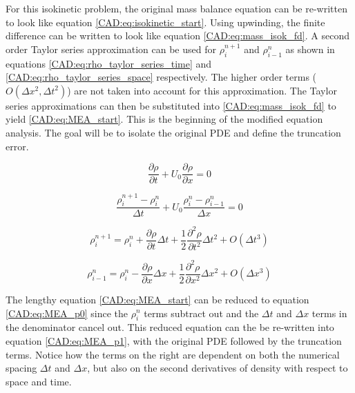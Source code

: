 \documentclass{mc2015}
\begin{document}
    For this isokinetic problem, the original mass balance equation can be re-written to 
    look like equation \ref{CAD:eq:isokinetic_start}. Using upwinding, the finite difference
    can be written to look like equation \ref{CAD:eq:mass_isok_fd}. A second order Taylor 
    series approximation can be used for $\rho_{i}^{n+1}$ and $\rho_{i-1}^{n}$ as shown 
    in equations \ref{CAD:eq:rho_taylor_series_time} and \ref{CAD:eq:rho_taylor_series_space} 
    respectively. The higher order terms ($O(\Delta x^{2},\Delta t^{2} )$) are
    not taken into account for this approximation. The Taylor series
    approximations can then be substituted into \ref{CAD:eq:mass_isok_fd} to yield
    \ref{CAD:eq:MEA_start}. This is the beginning of the modified equation analysis.
    The goal will be to isolate the original PDE and define the truncation error.
    
    \begin{equation}
    	\label{CAD:eq:isokinetic_start}
    	\frac{\partial \rho}{\partial t} + U_{0} \frac{\partial \rho}{\partial x} = 0
    \end{equation}
    
    \begin{equation}
    	\label{CAD:eq:mass_isok_fd}
    	\frac{ \rho_{i}^{n+1} - \rho_{i}^{n} }{\Delta t} 
    	+ U_{0} \frac{\rho_{i}^{n} - \rho_{i-1}^{n}}{\Delta x} = 0
    \end{equation}
    
    \begin{equation}
    	\label{CAD:eq:rho_taylor_series_time}
    	\rho_{i}^{n+1} =  \rho_{i}^{n} + 
    	\frac{\partial \rho}{\partial t} \Delta t +
    	\frac{1}{2} \frac{\partial^2 \rho}{\partial t^2} \Delta t^2 + O(\Delta t^{3})
    \end{equation}
    
    \begin{equation}
    	\label{CAD:eq:rho_taylor_series_space}
    	\rho_{i-1}^{n} =  \rho_{i}^{n} - 
    	\frac{\partial \rho}{\partial x} \Delta x +
    	\frac{1}{2} \frac{\partial^2 \rho}{\partial x^2} \Delta x^2 + O(\Delta x^{3})
    \end{equation}
    
    The lengthy equation \ref{CAD:eq:MEA_start} can be reduced to equation
    \ref{CAD:eq:MEA_p0} since the $\rho_{i}^{n}$ terms subtract out and the $\Delta
    t$ and $\Delta x$ terms in the denominator cancel out. This reduced equation
    can the be re-written into equation \ref{CAD:eq:MEA_p1}, with the original PDE
    followed by the truncation terms. Notice how the terms on the right are
    dependent on both the numerical spacing $\Delta t$ and $\Delta x$, but also
    on the second derivatives of density with respect to space and time.
    
\end{document}
